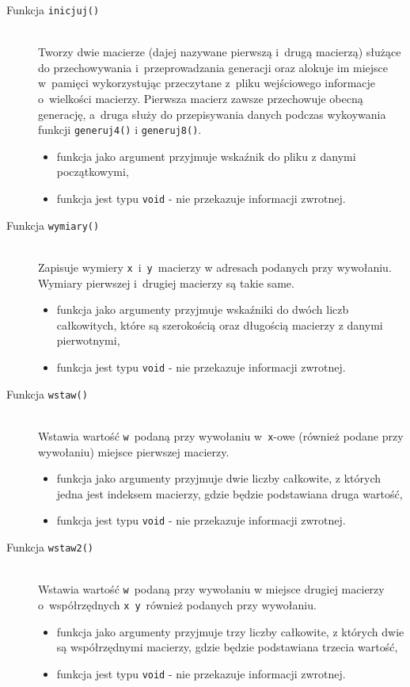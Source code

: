 \documentclass[a4paper,12pt,oneside]{article}
\begin{document}
\begin{description}
\item[Funkcja \texttt{inicjuj()}] \hfill \\
Tworzy dwie macierze (dajej nazywane pierwszą i~drugą macierzą) służące do przechowywania i~przeprowadzania generacji oraz alokuje im miejsce w~pamięci wykorzystując przeczytane z~pliku wejściowego informacje o~wielkości macierzy. Pierwsza macierz zawsze przechowuje obecną generację, a~druga służy do przepisywania danych podczas wykoywania funkcji \verb+generuj4()+ i \verb+generuj8()+.
\begin{itemize}
\item funkcja jako argument przyjmuje wskaźnik do pliku z danymi początkowymi,
\item funkcja jest typu \verb+void+ - nie przekazuje informacji zwrotnej.
\end{itemize}

\item[Funkcja \texttt{wymiary()}] \hfill \\
Zapisuje wymiery \verb+x+~i~\verb+y+~macierzy w adresach podanych przy wywołaniu. Wymiary pierwszej i~drugiej macierzy są takie same.
\begin{itemize}
\item funkcja jako argumenty przyjmuje wskaźniki do dwóch liczb całkowitych, które są szerokością oraz długością macierzy z danymi pierwotnymi,
\item funkcja jest typu \verb+void+ - nie przekazuje informacji zwrotnej.
\end{itemize}

\item[Funkcja \texttt{wstaw()}] \hfill \\
Wstawia wartość \verb+w+~podaną przy wywołaniu w~\verb+x+-owe (również podane przy wywołaniu) miejsce pierwszej macierzy.
\begin{itemize}
\item funkcja jako argumenty przyjmuje dwie liczby całkowite, z których jedna jest indeksem macierzy, gdzie będzie podstawiana druga wartość,
\item funkcja jest typu \verb+void+ - nie przekazuje informacji zwrotnej.
\end{itemize}

\item[Funkcja \texttt{wstaw2()}] \hfill \\
Wstawia wartość \verb+w+~podaną przy wywołaniu w miejsce drugiej macierzy o~współrzędnych \verb+x+~\verb+y+~również podanych przy wywołaniu.
\begin{itemize}
\item funkcja jako argumenty przyjmuje trzy liczby całkowite, z których dwie są współrzędnymi macierzy, gdzie będzie podstawiana trzecia wartość,
\item funkcja jest typu \verb+void+ - nie przekazuje informacji zwrotnej.
\end{itemize}


\end{description}
\end{document}
